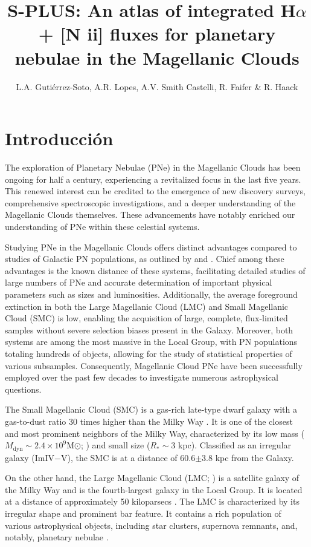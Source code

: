 \documentclass[baaa]{baaa}
\title{S-PLUS: An atlas of integrated H$\alpha$ + [N {\sc ii}] fluxes for planetary nebulae in the Magellanic Clouds}
\author{
L.A. Gutiérrez-Soto\inst{1},
A.R. Lopes\inst{1},
A.V. Smith Castelli\inst{1,2},
R. Faifer\inst{1,2}
\&
R. Haack\inst{1,2}
}
\institute{
Instituto de Astrofísica de La Plata, CONICET--UNLP, Argentina \and
Facultad de Ciencias Astron\'omicas y Geof{\'\i}sicas, UNLP, Argentina
}
\begin{document}
\maketitle
\section{Introducci\'on}\label{S_intro}

The exploration of Planetary Nebulae (PNe) in the Magellanic Clouds has been ongoing for half a century, experiencing a revitalized focus in the last five years.
This renewed interest can be credited to the emergence of new discovery surveys, comprehensive spectroscopic investigations, and a deeper understanding of
the Magellanic Clouds themselves. These advancements have notably enriched our understanding of PNe within these celestial systems.

Studying PNe in the Magellanic Clouds offers distinct advantages compared to studies of Galactic PN populations, as outlined by \citet{Jacoby:2002}
and \citet{Shaw:2006}. Chief among these advantages is the known distance of these systems, facilitating detailed studies of large numbers of PNe
and accurate determination of important physical parameters such as sizes and luminosities. Additionally, the average foreground extinction
in both the Large Magellanic Cloud (LMC) and Small Magellanic Cloud (SMC) is low, enabling the acquisition of large, complete,
flux-limited samples without severe selection biases present in the Galaxy. Moreover, both systems are among the most massive in the
Local Group, with PN populations totaling hundreds of objects, allowing for the study of statistical properties of various subsamples.
Consequently, Magellanic Cloud PNe have been successfully employed over the past few decades to investigate numerous astrophysical questions.

The Small Magellanic Cloud (SMC) is a gas-rich late-type dwarf galaxy \citep{Bolatto:2007} with a gas-to-dust ratio 30 times higher than the
Milky Way \citep{Stanimirovic:2000}. It is one of the closest and most prominent neighbors of the Milky Way, characterized
by its low mass ($M_{\text{dyn}} \sim 2.4\times 10^{9}$M$\odot$; \citealp{Stanimirovi:2004}) and small size ($R_{*} \sim 3$ kpc).
Classified as an irregular galaxy (ImIV$-$V), the SMC is at a distance of 60.6$\pm$3.8 kpc from the Galaxy.

On the other hand, the Large Magellanic Cloud (LMC; \citealp{Meixner:2006}) is a satellite galaxy of the Milky Way and is the fourth-largest galaxy in the Local Group.
It is located at a distance of approximately 50 kiloparsecs \citep{Feast:1999}. The LMC is characterized by its irregular shape and prominent bar feature.
It contains a rich population of various astrophysical objects, including star clusters, supernova remnants, and, notably, planetary nebulae \citep{Elson:1987, Chu:1993, Leisy:1996}.
\end{document}
